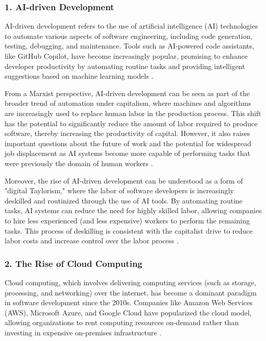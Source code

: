 \begin{refsection}
\begin{multicols}{2}
{\subsubsection*{1. AI-driven Development}

AI-driven development refers to the use of artificial intelligence (AI) technologies to automate various aspects of software engineering, including code generation, testing, debugging, and maintenance. Tools such as AI-powered code assistants, like GitHub Copilot, have become increasingly popular, promising to enhance developer productivity by automating routine tasks and providing intelligent suggestions based on machine learning models \cite{zhao2020applications}.

From a Marxist perspective, AI-driven development can be seen as part of the broader trend of automation under capitalism, where machines and algorithms are increasingly used to replace human labor in the production process. This shift has the potential to significantly reduce the amount of labor required to produce software, thereby increasing the productivity of capital. However, it also raises important questions about the future of work and the potential for widespread job displacement as AI systems become more capable of performing tasks that were previously the domain of human workers \cite{braverman1974labor}.

Moreover, the rise of AI-driven development can be understood as a form of "digital Taylorism," where the labor of software developers is increasingly deskilled and routinized through the use of AI tools. By automating routine tasks, AI systems can reduce the need for highly skilled labor, allowing companies to hire less experienced (and less expensive) workers to perform the remaining tasks. This process of deskilling is consistent with the capitalist drive to reduce labor costs and increase control over the labor process \cite{scholz2013digital}.

\subsubsection*{2. The Rise of Cloud Computing}

Cloud computing, which involves delivering computing services (such as storage, processing, and networking) over the internet, has become a dominant paradigm in software development since the 2010s. Companies like Amazon Web Services (AWS), Microsoft Azure, and Google Cloud have popularized the cloud model, allowing organizations to rent computing resources on-demand rather than investing in expensive on-premises infrastructure \cite{armbrust2010view}.

}
\end{multicols}
\end{refsection}
